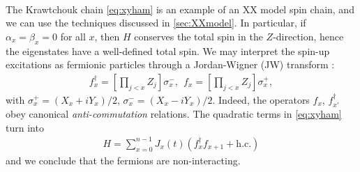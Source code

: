 \paragraph{}
The Krawtchouk chain \cref{eq:xyham} is an example of an XX model spin chain, and we can use the techniques discussed in \cref{sec:XXmodel}. In particular, if $\alpha_x = \beta_x = 0$ for all $x$, then $H$ conserves the total spin in the $Z$-direction, hence the eigenstates have a well-defined total spin. We may interpret the spin-up excitations as fermionic particles through a Jordan-Wigner (JW) transform \cite{Jordan1928}:
\begin{align}
f^\dagger_x = [ \prod_{j < x} Z_{j} ] \sigma_x^-, \ \ f_x = [ \prod_{j < x} Z_{j} ] \sigma_x^+,
\label{eq:kcjw}
\end{align}
with $\sigma^+_x=(X_x + i Y_x)/2$,  $\sigma^-_x=(X_x - i Y_x)/2$.
Indeed, the operators $f_x$, $f_{x'}^\dagger$ obey canonical {\em anti-commutation} relations. The quadratic terms in \cref{eq:xyham} turn into
\begin{align}
H = \sum_{x=0}^{n-1} J_x(t) \left( f^\dagger_x f_{x+1} + \text{h.c.} \right)
\end{align}
and we conclude that the fermions are non-interacting.

